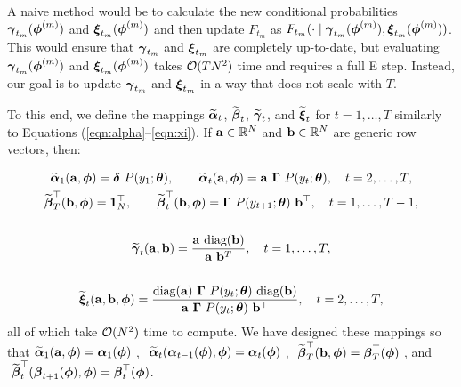 A naive method would be to calculate the new conditional probabilities $\boldsymbol{\gamma}_{t_m}(\boldsymbol{\phi}^{(m)})$ and $\boldsymbol{\xi}_{t_m}(\boldsymbol{\phi}^{(m)})$ and then update $F_{t_m}$ as $F_{t_m}(\cdot \mid \boldsymbol{\gamma}_{t_m}(\boldsymbol{\phi}^{(m)}), \boldsymbol{\xi}_{t_m}(\boldsymbol{\phi}^{(m)}))$. This would ensure that $\boldsymbol{\gamma}_{t_m}$ and $\boldsymbol{\xi}_{t_m}$ are completely up-to-date, but evaluating $\boldsymbol{\gamma}_{t_m}(\boldsymbol{\phi}^{(m)})$ and $\boldsymbol{\xi}_{t_m}(\boldsymbol{\phi}^{(m)})$ takes $\mathcal{O}(TN^2)$ time and requires a full E step. Instead, our goal is to update $\boldsymbol{\gamma}_{t_m}$ and $\boldsymbol{\xi}_{t_m}$ in a way that does not scale with $T$.
%

To this end, we define the mappings $\widetilde {\boldsymbol{\alpha}}_t$, $\widetilde {\boldsymbol{\beta}}_t$, $\widetilde {\boldsymbol{\gamma}}_t$, and $\widetilde {\boldsymbol{\xi}}_t$ for $t = 1,\ldots,T$ similarly to Equations (\ref{eqn:alpha}--\ref{eqn:xi}). If $\mathbf{a} \in \mathbb{R}^N$ and $\mathbf{b} \in \mathbb{R}^N$ are generic row vectors, then:

\begin{gather}
    \widetilde {\boldsymbol{\alpha}}_1(\mathbf{a},\boldsymbol{\phi}) = \boldsymbol{\delta} ~ P(y_1;\boldsymbol{\theta}), \qquad \widetilde {\boldsymbol{\alpha}}_t(\mathbf{a},\boldsymbol{\phi}) = \mathbf{a} ~ \boldsymbol{\Gamma} ~ P(y_t;\boldsymbol{\theta}), \quad t = 2,\ldots,T, \label{eqn:tilde_alpha} \\
    \widetilde {\boldsymbol{\beta}}^\top_T(\mathbf{b},\boldsymbol{\phi}) = \mathbf{1}_N^\top, \qquad \widetilde {\boldsymbol{\beta}}^\top_t(\mathbf{b},\boldsymbol{\phi}) = \boldsymbol{\Gamma} ~ P(y_{t+1};\boldsymbol{\theta}) ~ \mathbf{b}^\top, \quad t = 1,\ldots,T-1, \label{eqn:tilde_beta} \\ \nonumber \\
    \widetilde {\boldsymbol{\gamma}}_t(\mathbf{a},\mathbf{b}) = \frac{\mathbf{a} ~ \text{diag}(\mathbf{b})}{\mathbf{a} ~ \mathbf{b}^T}, \quad t = 1,\ldots,T, \label{eqn:tilde_gamma} \\ \nonumber \\
    \widetilde {\boldsymbol{\xi}}_{t}(\mathbf{a},\mathbf{b},\boldsymbol{\phi}) = \frac{\text{diag}(\mathbf{a}) ~ \boldsymbol{\Gamma} ~ P(y_t;\boldsymbol{\theta}) ~ \text{diag}(\mathbf{b})}{\mathbf{a} ~ \boldsymbol{\Gamma} ~ P(y_{t};\boldsymbol{\theta}) ~ \mathbf{b}^\top}, \quad t = 2,\ldots,T \label{eqn:tilde_xi},
\end{gather}
%
all of which take $\mathcal{O}(N^2)$ time to compute. We have designed these mappings so that $\widetilde {\boldsymbol{\alpha}}_1(\mathbf{a},\boldsymbol{\phi}) = \boldsymbol{\alpha}_{1}(\boldsymbol{\phi})~$, $~\widetilde {\boldsymbol{\alpha}}_t(\boldsymbol{\alpha}_{t-1}(\boldsymbol{\phi}),\boldsymbol{\phi}) = \boldsymbol{\alpha}_{t}(\boldsymbol{\phi})~$, $~\widetilde {\boldsymbol{\beta}}^\top_T(\mathbf{b},\boldsymbol{\phi}) = \boldsymbol{\beta}^\top_{T}(\boldsymbol{\phi})~$, and $~\widetilde {\boldsymbol{\beta}}^\top_t(\boldsymbol{\beta}_{t+1}(\boldsymbol{\phi}),\boldsymbol{\phi}) = \boldsymbol{\beta}^\top_{t}(\boldsymbol{\phi})$.

